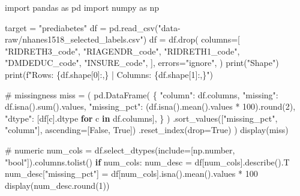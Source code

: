 \documentclass[
  letterpaper,
  DIV=11,
  numbers=noendperiod]{scrartcl}
\newenvironment{Shaded}{\begin{snugshade}}{\end{snugshade}}
\newcommand{\BuiltInTok}[1]{\textcolor[rgb]{0.00,0.23,0.31}{#1}}
\newcommand{\CommentTok}[1]{\textcolor[rgb]{0.37,0.37,0.37}{#1}}
\newcommand{\ControlFlowTok}[1]{\textcolor[rgb]{0.00,0.23,0.31}{\textbf{#1}}}
\newcommand{\DecValTok}[1]{\textcolor[rgb]{0.68,0.00,0.00}{#1}}
\newcommand{\ImportTok}[1]{\textcolor[rgb]{0.00,0.46,0.62}{#1}}
\newcommand{\KeywordTok}[1]{\textcolor[rgb]{0.00,0.23,0.31}{\textbf{#1}}}
\newcommand{\NormalTok}[1]{\textcolor[rgb]{0.00,0.23,0.31}{#1}}
\newcommand{\OperatorTok}[1]{\textcolor[rgb]{0.37,0.37,0.37}{#1}}
\newcommand{\SpecialCharTok}[1]{\textcolor[rgb]{0.37,0.37,0.37}{#1}}
\newcommand{\SpecialStringTok}[1]{\textcolor[rgb]{0.13,0.47,0.30}{#1}}
\newcommand{\StringTok}[1]{\textcolor[rgb]{0.13,0.47,0.30}{#1}}
\newcommand{\VariableTok}[1]{\textcolor[rgb]{0.07,0.07,0.07}{#1}}
\begin{document}
\begin{Shaded}
\begin{Highlighting}[]
\ImportTok{import}\NormalTok{ pandas }\ImportTok{as}\NormalTok{ pd}
\ImportTok{import}\NormalTok{ numpy }\ImportTok{as}\NormalTok{ np}

\NormalTok{target }\OperatorTok{=} \StringTok{"prediabetes"}
\NormalTok{df }\OperatorTok{=}\NormalTok{ pd.read\_csv(}\StringTok{"data{-}raw/nhanes1518\_selected\_labels.csv"}\NormalTok{)}
\NormalTok{df }\OperatorTok{=}\NormalTok{ df.drop(}
\NormalTok{    columns}\OperatorTok{=}\NormalTok{[}
        \StringTok{"RIDRETH3\_code"}\NormalTok{,}
        \StringTok{"RIAGENDR\_code"}\NormalTok{,}
        \StringTok{"RIDRETH1\_code"}\NormalTok{,}
        \StringTok{"DMDEDUC\_code"}\NormalTok{,}
        \StringTok{"INSURE\_code"}\NormalTok{,}
\NormalTok{    ],}
\NormalTok{    errors}\OperatorTok{=}\StringTok{"ignore"}\NormalTok{,}
\NormalTok{)}
\BuiltInTok{print}\NormalTok{(}\StringTok{"Shape"}\NormalTok{)}
\BuiltInTok{print}\NormalTok{(}\SpecialStringTok{f"Rows: }\SpecialCharTok{\{}\NormalTok{df}\SpecialCharTok{.}\NormalTok{shape[}\DecValTok{0}\NormalTok{]}\SpecialCharTok{:,\}}\SpecialStringTok{ | Columns: }\SpecialCharTok{\{}\NormalTok{df}\SpecialCharTok{.}\NormalTok{shape[}\DecValTok{1}\NormalTok{]}\SpecialCharTok{:,\}}\SpecialStringTok{"}\NormalTok{)}


\CommentTok{\# missingness}
\NormalTok{miss }\OperatorTok{=}\NormalTok{ (}
\NormalTok{    pd.DataFrame(}
\NormalTok{        \{}
            \StringTok{"column"}\NormalTok{: df.columns,}
            \StringTok{"missing"}\NormalTok{: df.isna().}\BuiltInTok{sum}\NormalTok{().values,}
            \StringTok{"missing\_pct"}\NormalTok{: (df.isna().mean().values }\OperatorTok{*} \DecValTok{100}\NormalTok{).}\BuiltInTok{round}\NormalTok{(}\DecValTok{2}\NormalTok{),}
            \StringTok{"dtype"}\NormalTok{: [df[c].dtype }\ControlFlowTok{for}\NormalTok{ c }\KeywordTok{in}\NormalTok{ df.columns],}
\NormalTok{        \}}
\NormalTok{    )}
\NormalTok{    .sort\_values([}\StringTok{"missing\_pct"}\NormalTok{, }\StringTok{"column"}\NormalTok{], ascending}\OperatorTok{=}\NormalTok{[}\VariableTok{False}\NormalTok{, }\VariableTok{True}\NormalTok{])}
\NormalTok{    .reset\_index(drop}\OperatorTok{=}\VariableTok{True}\NormalTok{)}
\NormalTok{)}
\NormalTok{display(miss)}

\CommentTok{\# numeric}
\NormalTok{num\_cols }\OperatorTok{=}\NormalTok{ df.select\_dtypes(include}\OperatorTok{=}\NormalTok{[np.number, }\StringTok{"bool"}\NormalTok{]).columns.tolist()}
\ControlFlowTok{if}\NormalTok{ num\_cols:}
\NormalTok{    num\_desc }\OperatorTok{=}\NormalTok{ df[num\_cols].describe().T}
\NormalTok{    num\_desc[}\StringTok{"missing\_pct"}\NormalTok{] }\OperatorTok{=}\NormalTok{ df[num\_cols].isna().mean().values }\OperatorTok{*} \DecValTok{100}
\NormalTok{    display(num\_desc.}\BuiltInTok{round}\NormalTok{(}\DecValTok{1}\NormalTok{))}


\end{Highlighting}
\end{Shaded}
\end{document}
